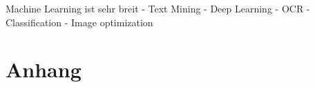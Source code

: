 \documentclass{hwz}
\begin{document}
Machine Learning ist sehr breit
  - Text Mining
  - Deep Learning
  - OCR
  - Classification
  - Image optimization
  
\newpage
\section{Anhang}


\newpage
{}
\end{document}
